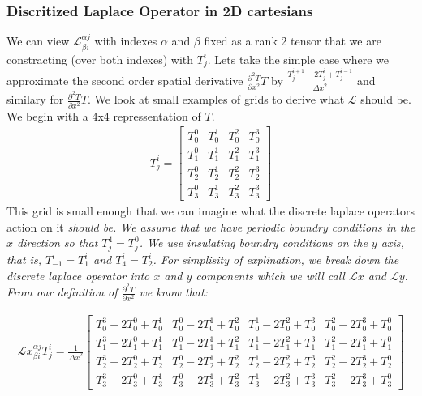\documentclass{article}
\begin{document}
\subsubsection*{Discritized Laplace Operator in 2D cartesians}
We can view $\mathcal{L}^{\alpha j}_{\beta i}$ with indexes $\alpha$ and $\beta$ fixed as a rank 2 tensor that we are constracting (over both indexes) with $T^{i}_{j}$. 
\newline
Lets take the simple case where we approximate the second order spatial derivative $\frac{\partial^2 T}{\partial {x}^2} T$ by $\frac{T^{i+1}_{j} - 2 T^{i}_{j} + T^{i-1}_{j}}{{\Delta x}^2}$ and similary for $\frac{\partial^2 T}{\partial {x}^2} T$. We look at small examples of grids to derive what $\mathcal{L}$ should be. We begin with a 4x4 repressentation of $T$.
\begin{gather}
T^{i}_{j} = \begin{bmatrix}	T^{0}_{0} & T^{1}_{0} & T^{2}_{0} & T^{3}_{0} \\ T^{0}_{1} & T^{1}_{1} & T^{2}_{1} & T^{3}_{1} \\ T^{0}_{2} & T^{1}_{2} & T^{2}_{2} & T^{3}_{2} \\ T^{0}_{3} & T^{1}_{3} & T^{2}_{3} & T^{3}_{3} \end{bmatrix}
\end{gather}
This grid is small enough that we can imagine what the discrete laplace operators action on it \it should be. We assume that we have periodic boundry conditions in the $x$ direction so that $T^{4}_{j}=T^{0}_{j}$. We use insulating boundry conditions on the $y$ axis, that is, $T^{i}_{-1}=T^{i}_{1}$ and $T^{i}_{4}=T^{i}_{2}$. For simplisity of explination, we break down the discrete laplace operator into $x$ and $y$ components which we will call $\mathcal{L}x$ and $\mathcal{L}y$. 
From our definition of $\frac{\partial^2 T}{\partial x^2}$ we know that:

\begin{gather}
{\mathcal{L}x}^{\alpha j}_{\beta i} T^{i}_{j} = \frac{1}{ {\Delta x}^2 } \begin{bmatrix} T^{3}_{0}-2T^{0}_{0} + T^{1}_{0} & T^{0}_{0}-2 T^{1}_{0} + T^{2}_{0} & T^{1}_{0}-2 T^{2}_{0} + T^{3}_{0} & T^{2}_{0}-2 T^{3}_{0} + T^{0}_{0} \\ T^{3}_{1}-2T^{0}_{1} + T^{1}_{1} & T^{0}_{1}-2 T^{1}_{1} + T^{2}_{1} & T^{1}_{1}-2 T^{2}_{1} + T^{3}_{1} & T^{2}_{1}-2 T^{3}_{1} + T^{0}_{1} \\
T^{3}_{2}-2T^{0}_{2} + T^{1}_{2} & T^{0}_{2}-2 T^{1}_{2} + T^{2}_{2} & T^{1}_{2}-2 T^{2}_{2} + T^{3}_{2} & T^{2}_{2}-2 T^{3}_{2} + T^{0}_{2} \\
T^{3}_{3}-2T^{0}_{3} + T^{1}_{3} & T^{0}_{3}-2 T^{1}_{3} + T^{2}_{3} & T^{1}_{3}-2 T^{2}_{3} + T^{3}_{3} & T^{2}_{3}-2 T^{3}_{3} + T^{0}_{3} \end{bmatrix}
\end{gather}
\end{document}
